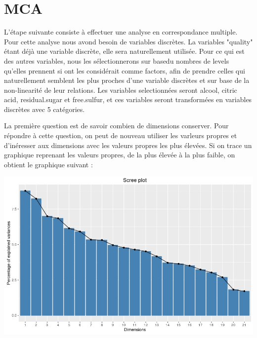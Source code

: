 \documentclass[11pt,a4paper]{article}
\begin{document}
\section{MCA}

L'étape suivante consiste à effectuer une analyse en correspondance multiple. Pour cette analyse nous avond besoin de variables discrètes. La variables "quality" étant déjà une variable discrète, elle sera naturellement utilisée. Pour ce qui est des autres variables, nous les sélectionnerons sur basedu nombres de levels qu'elles prennent si ont les considérait comme factors, afin de prendre celles qui naturellement semblent les plus proches d'une variable discrètes et sur base de la non-linearité de leur relations. Les variables selectionnées seront alcool, citric acid, residual.sugar et free.sulfur, et ces variables seront transformées en variables discrètes avec 5 catégories.

La première question est de savoir combien de  dimensions conserver. Pour répondre à cette question, on peut de nouveau utiliser les varleurs propres et d'inéresser aux dimensions avec les valeurs propres les plus élevées. Si on trace un graphique reprenant les valeurs propres, de la plus élevée à la plus faible, on obtient le graphique suivant : 

\begin{center}
\includegraphics[scale=0.4]{"mca-eigen"}
\end{center}
\end{document}
